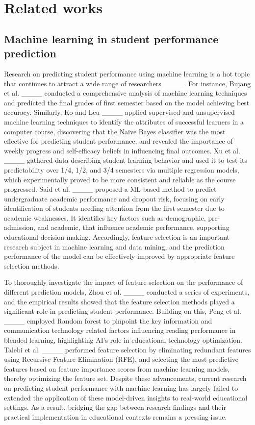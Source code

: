 \section{Related works}
\subsection{Machine learning in student performance prediction}
Research on predicting student performance using machine learning is a hot topic that continues to attract a wide range of researchers ____. For instance, Bujang et al. ____ conducted a comprehensive analysis of machine learning techniques and predicted the final grades of first semester based on the model achieving best accuracy. Similarly, Ko and Leu ____ applied supervised and unsupervised machine learning techniques to identify the attributes of successful learners in a computer course, discovering that the Naïve Bayes classifier was the most effective for predicting student performance, and revealed the importance of weekly progress and self-efficacy beliefs in influencing final outcomes. Xu et al. ____ gathered data describing student learning behavior and used it to test its predictability over 1/4, 1/2, and 3/4 semesters via multiple regression models, which experimentally proved to be more consistent and reliable as the course progressed. Said et al. ____ proposed a ML-based method to predict undergraduate academic performance and dropout risk, focusing on early identification of students needing attention from the first semester due to academic weaknesses. It identifies key factors such as demographic, pre-admission, and academic, that influence academic performance, supporting educational decision-making. Accordingly, feature selection is an important research subject in machine learning and data mining, and the prediction performance of the model can be effectively improved by appropriate feature selection methods. 

To thoroughly investigate the impact of feature selection on the performance of different prediction models, Zhou et al. ____ conducted a series of experiments, and the empirical results showed that the feature selection methods played a significant role in predicting student performance. Building on this, Peng et al. ____ employed Random forest to pinpoint the key information and communication technology related factors influencing reading performance in blended learning, highlighting AI's role in educational technology optimization. Talebi et al. ____ performed feature selection by eliminating redundant features using Recursive Feature Elimination (RFE), and selecting the most predictive features based on feature importance scores from machine learning models, thereby optimizing the feature set. Despite these advancements, current research on predicting student performance with machine learning has largely failed to extended the application of these model-driven insights to real-world educational settings. As a result, bridging the gap between research findings and their practical implementation in educational contexts remains a pressing issue. 

